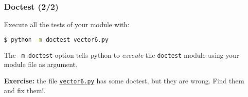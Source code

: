\documentclass[english,serif,mathserif,xcolor=pdftex,dvipsnames,table]{beamer}
\begin{document}
\begin{frame}[fragile]
  \frametitle{Doctest (2/2)}

  Execute all the tests of your module with:

  \begin{lstlisting}[language=sh]
$ python -m doctest vector6.py
  \end{lstlisting}

  \+
  The \lstinline|-m doctest| option tells python to \textit{execute} the
  \lstinline|doctest| module using your module file as argument.

  \+ \textbf{Exercise:} the file
  \href{http://www.gc3.uzh.ch/vector6.py}{\texttt{vector6.py}}
  has some doctest, but they are wrong. Find them and fix them!.
\end{frame}
\end{document}
